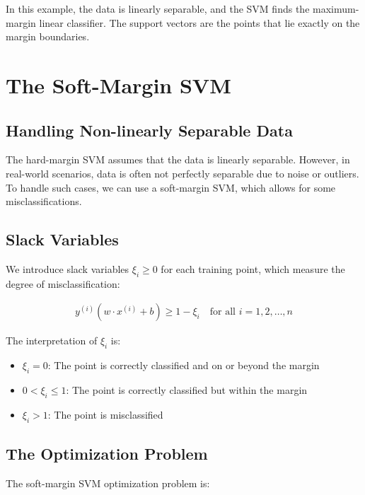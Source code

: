 \documentclass{article}
\begin{document}
In this example, the data is linearly separable, and the SVM finds the maximum-margin linear classifier. The support vectors are the points that lie exactly on the margin boundaries.

\section{The Soft-Margin SVM}

\subsection{Handling Non-linearly Separable Data}
The hard-margin SVM assumes that the data is linearly separable. However, in real-world scenarios, data is often not perfectly separable due to noise or outliers. To handle such cases, we can use a soft-margin SVM, which allows for some misclassifications.

\subsection{Slack Variables}
We introduce slack variables $\xi_i \geq 0$ for each training point, which measure the degree of misclassification:

\begin{align}
y^{(i)}(w \cdot x^{(i)} + b) \geq 1 - \xi_i \quad \text{for all } i = 1, 2, \ldots, n
\end{align}

The interpretation of $\xi_i$ is:
\begin{itemize}
    \item $\xi_i = 0$: The point is correctly classified and on or beyond the margin
    \item $0 < \xi_i \leq 1$: The point is correctly classified but within the margin
    \item $\xi_i > 1$: The point is misclassified
\end{itemize}

\subsection{The Optimization Problem}
The soft-margin SVM optimization problem is:

\end{document}
